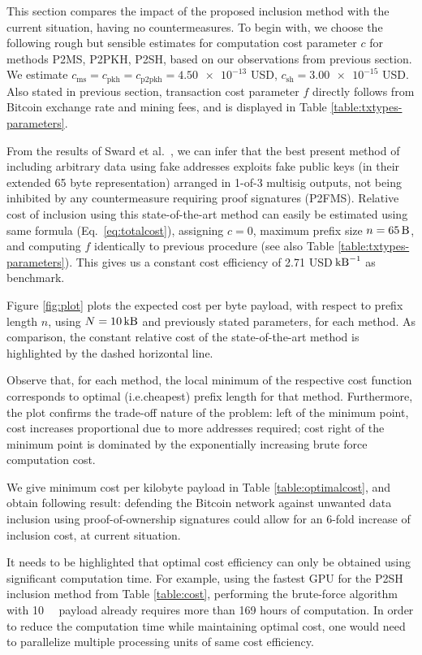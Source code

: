 \documentclass[a4paper,11pt,titlepage]{scrbook}
\begin{document}
This section compares the impact of the proposed inclusion method with the current situation, having no countermeasures.
To begin with, we choose the following rough but sensible estimates for computation cost parameter $c$ for methods P2MS, P2PKH, P2SH, based on our observations from previous section.
We estimate $c_\text{ms}=c_\text{pkh}=c_\text{p2pkh}=\num{4.50e-13}$ USD, $c_\text{sh} = \num{3.00e-15}$ USD.
Also stated in previous section, transaction cost parameter $f$ directly follows from Bitcoin exchange rate and mining fees, and is displayed in Table \ref{table:txtypes-parameters}.

From the results of Sward et al.~\cite[cf.~Table 3]{sward_data_2018}, we can infer that the best present method of including arbitrary data using fake addresses exploits fake public keys (in their extended 65 byte representation) arranged in 1-of-3 multisig outputs, not being inhibited by any countermeasure requiring proof signatures (P2FMS).
Relative cost of inclusion using this state-of-the-art method can easily be estimated using same formula (Eq.~\ref{eq:totalcost}), assigning $c=0$, maximum prefix size $n=\SI{65}{\byte}$, and computing $f$ identically to previous procedure (see also Table \ref{table:txtypes-parameters}).
This gives us a constant cost efficiency of \num{2.71} USD$\,\si{\per\kilo\byte}$ as benchmark.

Figure \ref{fig:plot} plots the expected cost per byte payload, with respect to prefix length $n$, using $N=\SI{10}{\kilo\byte}$ and previously stated parameters, for each method.
As comparison, the constant relative cost of the state-of-the-art method is highlighted by the dashed horizontal line. 

Observe that, for each method, the local minimum of the respective cost function corresponds to optimal (i.e.\@ cheapest) prefix length for that method.
Furthermore, the plot confirms the trade-off nature of the problem: left of the minimum point, cost increases proportional due to more addresses required; cost right of the minimum point is dominated by the exponentially increasing brute force computation cost.

We give minimum cost per kilobyte payload in Table \ref{table:optimalcost},
and obtain following result: 
defending the Bitcoin network against unwanted data inclusion using proof-of-ownership signatures could allow for an 6-fold increase of inclusion cost, at current situation.

It needs to be highlighted that optimal cost efficiency can only be obtained using significant computation time.
For example, using the fastest GPU for the P2SH inclusion method from Table \ref{table:cost}, performing the brute-force algorithm with \SI{10}{\kilo\byte} payload already requires more than 169 hours of computation.
In order to reduce the computation time while maintaining optimal cost, one would need to parallelize multiple processing units of same cost efficiency.
\end{document}
